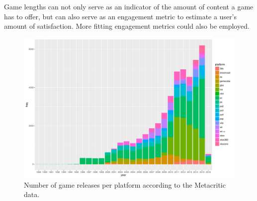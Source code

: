 Game lengths can not only serve as an indicator of the amount of content a game has to offer, but can also serve as an engagement metric to estimate a user's amount of satisfaction. More fitting engagement metrics could also be employed.


\begin{figure}[!t]
	\centering
	\includegraphics[width=1.0\columnwidth]{images/releases-per-year.pdf}
	\caption{Number of game releases per platform according to the Metacritic data.}
\label{fig:releases-per-year}
\end{figure}




